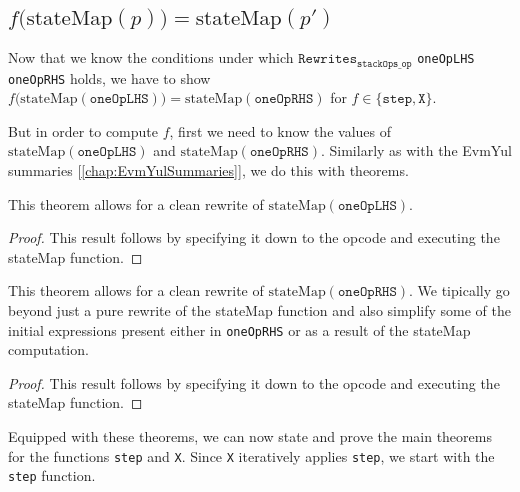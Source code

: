 \subsection{$f\bigl(\text{stateMap}(p)\bigr) = \text{stateMap}(p')$}

Now that we know the conditions under which
$\texttt{Rewrites}_{\texttt{stackOps_op}}$ \texttt{oneOpLHS} \texttt{oneOpRHS} holds,
we have to show $f\bigl(\text{stateMap}(\texttt{oneOpLHS})\bigr) =
\text{stateMap}(\texttt{oneOpRHS})$ for $f\in\{\texttt{step}, \texttt{X}\}$.

But in order to compute $f$, first we need to know the values of
$\text{stateMap}(\texttt{oneOpLHS})$ and $\text{stateMap}(\texttt{oneOpRHS})$.
Similarly as with the EvmYul summaries [\ref{chap:EvmYulSummaries}], we do this
with theorems.

\begin{theorem}\label{thm:oneOpLHS_equiv}
\leanok{}
This theorem allows for a clean rewrite of $\text{stateMap}(\texttt{oneOpLHS})$.
\end{theorem}
\begin{proof}
\leanok
This result follows by specifying it down to the opcode and executing the
stateMap function.
\end{proof}

\begin{theorem}\label{thm:oneOpRHS_equiv}
\leanok{}
This theorem allows for a clean rewrite of $\text{stateMap}(\texttt{oneOpRHS})$.
We tipically go beyond just a pure rewrite of the stateMap function and also
simplify some of the initial expressions present either in \texttt{oneOpRHS} or
as a result of the stateMap computation.
\end{theorem}
\begin{proof}
This result follows by specifying it down to the opcode and executing the
stateMap function.
\end{proof}

Equipped with these theorems, we can now state and prove the main theorems for
the functions \texttt{step} and \texttt{X}. Since \texttt{X} iteratively applies
\texttt{step}, we start with the \texttt{step} function.

